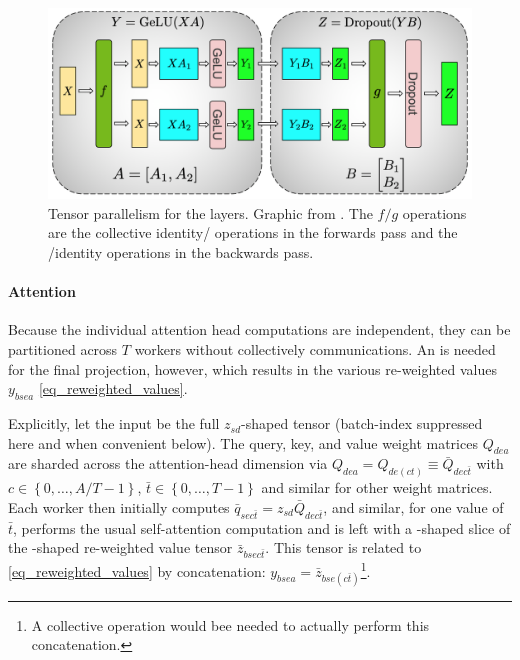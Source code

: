 \documentclass[11pt]{article}
\begin{document}
\begin{figure}[ht]
	\centering
	\includegraphics[scale=.33]{figures/mlp_mp_2.png}
	\caption{Tensor parallelism for the  layers. Graphic from
		\cite{shoeybi2020megatronlm}. The $ f/g $ operations are the collective
		identity/ operations in the forwards pass and the /identity
		operations in the backwards pass.}
	\label{fig_mlp_tensor_parallel}
\end{figure}


\paragraph{Attention} Because the individual attention head computations are independent, they can
be partitioned across $ T $ workers without collectively communications.  An  is
needed for the final projection, however, which results in the various re-weighted values $ y _{
bsea } $ \eqref{eq_reweighted_values}.

Explicitly, let the input be the full $ z _{ sd }$-shaped tensor (batch-index suppressed here and
when convenient below). The  query, key, and value weight matrices $ Q _{ dea
} $ are sharded across the attention-head dimension via $ Q _{ dea } = Q _{ de(c t) } \equiv
\bar{Q}_{ dec \bar{t} } $ with $ c \in \left \{ 0, \ldots , A/T-1 \right \} $, $ \bar{t}\in
\left \{ 0, \ldots , T-1 \right \} $ and similar for other weight matrices. Each worker then
initially computes $ \bar{q} _{ sec \bar{t} }= z _{ sd }\bar{Q}_{ dec \bar{t} } $, and similar,
for one value of $ \bar{t} $, performs the usual self-attention computation and is left with a
-shaped slice of the -shaped re-weighted
value tensor $\bar{z} _{ bsec \bar{t} } $. This tensor is related to
\eqref{eq_reweighted_values} by concatenation: $ y _{ bsea }=\bar{z} _{ bse(c \bar{t}) }
$\footnote{A collective operation would bee needed to actually perform this concatenation.}.
\end{document}
